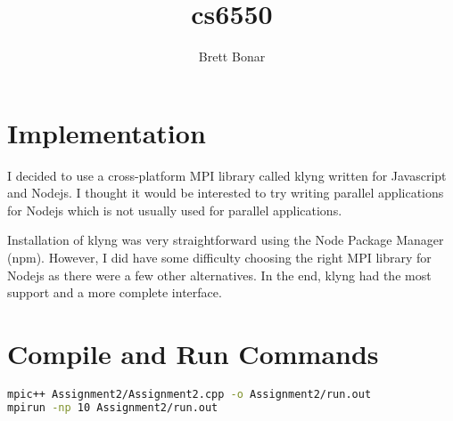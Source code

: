 \documentclass{article}
\title{cs6550}
\author{ Brett Bonar }
\begin{document}
\maketitle

\section{Implementation}
I decided to use a cross-platform MPI library called klyng written for Javascript and Nodejs. I thought it would be interested to try writing parallel applications for Nodejs which is not usually used for parallel applications.

Installation of klyng was very straightforward using the Node Package Manager (npm). However, I did have some difficulty choosing the right MPI library for Nodejs as there were a few other alternatives. In the end, klyng had the most support and a more complete interface.

\section{Compile and Run Commands}
\begin{lstlisting}[language=bash]
mpic++ Assignment2/Assignment2.cpp -o Assignment2/run.out
mpirun -np 10 Assignment2/run.out
\end{lstlisting}
\end{document}
